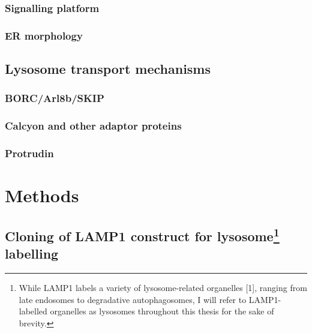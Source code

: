 \documentclass[
  12pt,
  a4paper,
]{book}
\begin{document}
\hypertarget{signalling-platform}{%
\subsubsection{Signalling platform}\label{signalling-platform}}

\hypertarget{er-morphology}{%
\subsubsection{ER morphology}\label{er-morphology}}

\hypertarget{lysosome-transport-mechanisms}{%
\subsection{Lysosome transport mechanisms}\label{lysosome-transport-mechanisms}}

\hypertarget{borcarl8bskip}{%
\subsubsection{BORC/Arl8b/SKIP}\label{borcarl8bskip}}

\hypertarget{calcyon-and-other-adaptor-proteins}{%
\subsubsection{Calcyon and other adaptor proteins}\label{calcyon-and-other-adaptor-proteins}}

\hypertarget{protrudin}{%
\subsubsection{Protrudin}\label{protrudin}}

\hypertarget{methods}{%
\section{Methods}\label{methods}}

\hypertarget{cloning}{%
\subsection[Cloning of LAMP1 construct for lysosome labelling]{\texorpdfstring{Cloning of LAMP1 construct for lysosome\footnote{While LAMP1 labels a variety of lysosome-related organelles {[}1{]}, ranging from late endosomes to degradative autophagosomes, I will refer to LAMP1-labelled organelles as lysosomes throughout this thesis for the sake of brevity.} labelling}{Cloning of LAMP1 construct for lysosome labelling}}\label{cloning}}
\end{document}
